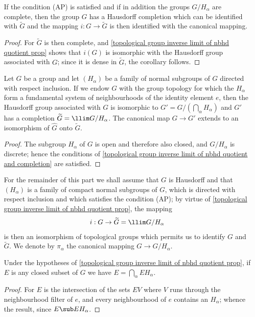 \begin{corollary}\label{topological group inverse limit of nbhd quotient and completion}
If the condition (AP) is satisfied and if in addition the groups $G/H_\alpha$ are complete, then the group $G$ has a Hausdorff completion which can be identified with $\widetilde{G}$ and the mapping $i:G\to\widetilde{G}$ is then identified with the canonical mapping.
\end{corollary}
\begin{proof}
For $\widetilde{G}$ is then complete, and \cref{topological group inverse limit of nbhd quotient prop} shows that $i(G)$ is isomorphic with the Hausdorff group associated with $G$; since it is dense in $\widetilde{G}$, the corollary follows.
\end{proof}
\begin{corollary}
Let $G$ be a group and let $(H_\alpha)$ be a family of normal subgroups of $G$ directed with respect inclusion. If we endow $G$ with the group topology for which the $H_\alpha$ form a fundamental system of neighbourhoods of the identity element $e$, then the Hausdorff group associated with $G$ is isomorphic to $G'=G/(\bigcap_\alpha H_\alpha)$ and $G'$ has a completion $\widetilde{G}=\llim G/H_\alpha$. The canonical map $G\to G'$ extends to an isomorphism of $\widehat{G}$ onto $\widetilde{G}$.
\end{corollary}
\begin{proof}
The subgroup $H_\alpha$ of $G$ is open and therefore also closed, and $G/H_\alpha$ is discrete; hence the conditions of \cref{topological group inverse limit of nbhd quotient and completion} are satisfied.
\end{proof}
For the remainder of this part we shall assume that $G$ is Hausdorff and that $(H_\alpha)$ is a family of compact normal subgroups of $G$, which is directed with respect inclusion and which satisfies the condition (AP); by virtue of \cref{topological group inverse limit of nbhd quotient prop}, the mapping
\[i:G\to\widetilde{G}=\llim G/H_\alpha\]
is then an isomorphism of topological groups which permits us to identify $G$ and $\widetilde{G}$. We denote by $\pi_\alpha$ the canonical mapping $G\to G/H_\alpha$.
\begin{lemma}\label{topological group closed subset is intersection of product}
Under the hypotheses of \cref{topological group inverse limit of nbhd quotient prop}, if $E$ is any closed subset of $G$ we have $E=\bigcap_\alpha EH_\alpha$.
\end{lemma}
\begin{proof}
For $E$ is the intersection of the sets $EV$ where $V$ runs through the neighbourhood filter of $e$, and every neighbourhood of $e$ contains an $H_\alpha$; whence the result, since $E\sub EH_\alpha$.
\end{proof}

